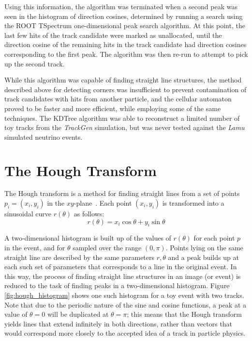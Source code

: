 Using this information, the algorithm was terminated when a second peak was seen in the histogram of direction cosines, determined by running a search using the ROOT TSpectrum one-dimensional peak search algorithm. At this point, the last few hits of the track candidate were marked as unallocated, until the direction cosine of the remaining hits in the track candidate had direction cosines corresponding to the first peak. The algorithm was then re-run to attempt to pick up the second track.

While this algorithm was capable of finding straight line structures, the method described above for detecting corners was insufficient to prevent contamination of track candidates with hits from another particle, and the cellular automaton proved to be faster and more efficient, while employing some of the same techniques. The KDTree algorithm was able to reconstruct a limited number of toy tracks from the \emph{TrackGen} simulation, but was never tested against the \emph{Lamu} simulated neutrino events.

\section{The Hough Transform}\label{sec:hough_transform}
The Hough transform is a method for finding straight lines from a set of points $p_i = (x_i, y_i)$ in the $xy$-plane~\citep{Hough1959}. Each point $(x_i, y_i)$ is transformed into a sinusoidal curve $r(\theta)$ as follows:
\begin{equation}
    r(\theta) = x_i \cos \theta + y_i \sin \theta
\end{equation}

A two-dimensional histogram is built up of the values of $r(\theta)$ for each point $p$ in the event, and for $\theta$ sampled over the range $(0,\pi)$. Points lying on the same straight line are described by the same parameters $r,\theta$ and a peak builds up at each such set of parameters that corresponds to a line in the original event. In this way, the process of finding straight line structures in an image (or event) is reduced to the task of finding peaks in a two-dimensional histogram. Figure \ref{fig:hough_histogram} shows one such histogram for a toy event with two tracks. Note that due to the periodic nature of the sine and cosine functions, a peak at a value of $\theta=0$ will be duplicated at $\theta=\pi$; this means that the Hough transform yields lines that extend infinitely in both directions, rather than vectors that would correspond more closely to the accepted idea of a track in particle physics.


